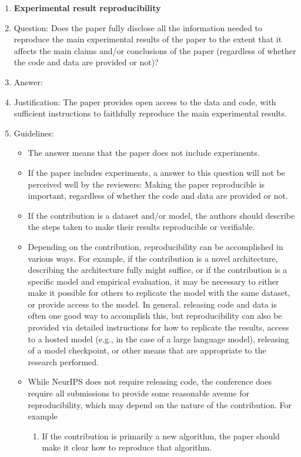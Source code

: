 \documentclass{article}
\begin{document}
\begin{enumerate}
    \item {\bf Experimental result reproducibility}
    \item[] Question: Does the paper fully disclose all the information needed to reproduce the main experimental results of the paper to the extent that it affects the main claims and/or conclusions of the paper (regardless of whether the code and data are provided or not)?
    \item[] Answer: \answerYes{} %
    \item[] Justification: The paper provides open access to the data and code, with sufficient instructions to faithfully reproduce the main experimental results.
    \item[] Guidelines:
    \begin{itemize}
        \item The answer \answerNA{} means that the paper does not include experiments.
        \item If the paper includes experiments, a \answerNo{} answer to this question will not be perceived well by the reviewers: Making the paper reproducible is important, regardless of whether the code and data are provided or not.
        \item If the contribution is a dataset and\slash or model, the authors should describe the steps taken to make their results reproducible or verifiable. 
        \item Depending on the contribution, reproducibility can be accomplished in various ways. For example, if the contribution is a novel architecture, describing the architecture fully might suffice, or if the contribution is a specific model and empirical evaluation, it may be necessary to either make it possible for others to replicate the model with the same dataset, or provide access to the model. In general. releasing code and data is often one good way to accomplish this, but reproducibility can also be provided via detailed instructions for how to replicate the results, access to a hosted model (e.g., in the case of a large language model), releasing of a model checkpoint, or other means that are appropriate to the research performed.
        \item While NeurIPS does not require releasing code, the conference does require all submissions to provide some reasonable avenue for reproducibility, which may depend on the nature of the contribution. For example
        \begin{enumerate}
            \item If the contribution is primarily a new algorithm, the paper should make it clear how to reproduce that algorithm.

\end{enumerate}
\end{itemize}
\end{enumerate}
\end{document}
